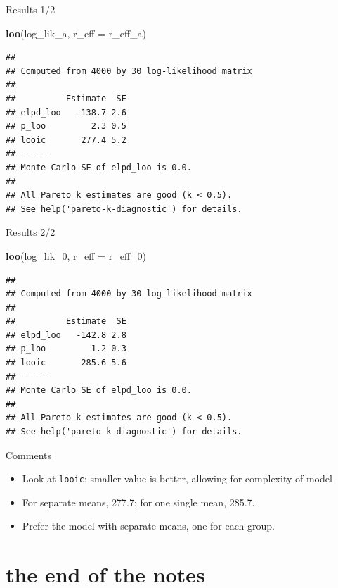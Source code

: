 \documentclass[
  ignorenonframetext,
]{beamer}
\newenvironment{Shaded}{\begin{snugshade}}{\end{snugshade}}
\newcommand{\DataTypeTok}[1]{\textcolor[rgb]{0.13,0.29,0.53}{#1}}
\newcommand{\DecValTok}[1]{\textcolor[rgb]{0.00,0.00,0.81}{#1}}
\newcommand{\KeywordTok}[1]{\textcolor[rgb]{0.13,0.29,0.53}{\textbf{#1}}}
\newcommand{\NormalTok}[1]{#1}
\providecommand{\tightlist}{%
  \setlength{\itemsep}{0pt}\setlength{\parskip}{0pt}}
\begin{document}
\begin{frame}[fragile]{Results 1/2}
\protect\hypertarget{results-12}{}

\footnotesize

\begin{Shaded}
\begin{Highlighting}[]
\KeywordTok{loo}\NormalTok{(log_lik_a, }\DataTypeTok{r_eff =}\NormalTok{ r_eff_a)}
\end{Highlighting}
\end{Shaded}

\begin{verbatim}
## 
## Computed from 4000 by 30 log-likelihood matrix
## 
##          Estimate  SE
## elpd_loo   -138.7 2.6
## p_loo         2.3 0.5
## looic       277.4 5.2
## ------
## Monte Carlo SE of elpd_loo is 0.0.
## 
## All Pareto k estimates are good (k < 0.5).
## See help('pareto-k-diagnostic') for details.
\end{verbatim}

\normalsize

\end{frame}

\begin{frame}[fragile]{Results 2/2}
\protect\hypertarget{results-22}{}

\small

\begin{Shaded}
\begin{Highlighting}[]
\KeywordTok{loo}\NormalTok{(log_lik_}\DecValTok{0}\NormalTok{, }\DataTypeTok{r_eff =}\NormalTok{ r_eff_}\DecValTok{0}\NormalTok{)}
\end{Highlighting}
\end{Shaded}

\begin{verbatim}
## 
## Computed from 4000 by 30 log-likelihood matrix
## 
##          Estimate  SE
## elpd_loo   -142.8 2.8
## p_loo         1.2 0.3
## looic       285.6 5.6
## ------
## Monte Carlo SE of elpd_loo is 0.0.
## 
## All Pareto k estimates are good (k < 0.5).
## See help('pareto-k-diagnostic') for details.
\end{verbatim}

\normalsize

\end{frame}

\begin{frame}[fragile]{Comments}
\protect\hypertarget{comments-34}{}

\begin{itemize}
\tightlist
\item
  Look at \texttt{looic}: smaller value is better, allowing for
  complexity of model
\item
  For separate means, 277.7; for one single mean, 285.7.
\item
  Prefer the model with separate means, one for each group.
\end{itemize}

\end{frame}

\hypertarget{the-end-of-the-notes}{%
\section{the end of the notes}\label{the-end-of-the-notes}}
\end{document}
